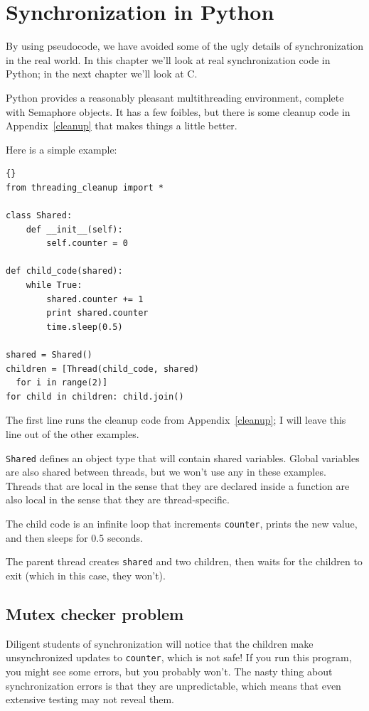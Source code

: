 \documentclass{book}
\begin{document}
\chapter{Synchronization in Python}
\label{pysync}

By using pseudocode, we have avoided some of the ugly
details of synchronization in the real world.  In this chapter
we'll look at real synchronization code in Python; in the
next chapter we'll look at C.

Python provides a reasonably pleasant multithreading environment,
complete with Semaphore objects.  It has
a few foibles, but there is some cleanup code in Appendix~\ref{cleanup}
that makes things a little better.

Here is a simple example:

\begin{lstlisting}[title={}]{}
from threading_cleanup import *

class Shared:
    def __init__(self):
        self.counter = 0

def child_code(shared):
    while True:
        shared.counter += 1
        print shared.counter
        time.sleep(0.5)

shared = Shared()
children = [Thread(child_code, shared) 
  for i in range(2)]
for child in children: child.join()
\end{lstlisting}

The first line runs the cleanup code from Appendix~\ref{cleanup};
I will leave this line out of the other examples.

    {\tt Shared} defines an object type that will contain shared variables.
Global variables are also shared between threads, but we won't
use any in these examples.  Threads that are local in the sense
that they are declared inside a function are also local in the
sense that they are thread-specific.

The child code is an infinite loop that increments {\tt counter},
prints the new value, and then sleeps for 0.5 seconds.

The parent thread creates {\tt shared} and two children,
then waits for the children to exit (which in this case, they won't).

\section{Mutex checker problem}

Diligent students of synchronization will notice that the
children make unsynchronized updates to {\tt counter}, which
is not safe!  If you run this program, you might see some
errors, but you probably won't.  The nasty thing about synchronization
errors is that they are unpredictable, which means that even
extensive testing may not reveal them.
\end{document}
